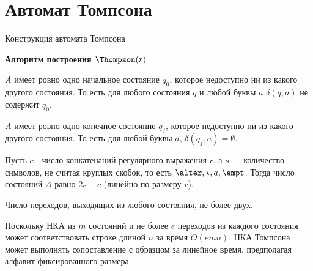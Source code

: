 \section{Автомат Томпсона}
\begin{frame}{Конструкция автомата Томпсона} {\vspace{-5pt}}
    \vspace{-5pt}
    \begin{block}{\bf Алгоритм построения $\Thompson(r)$}
        \begin{wideitemize}
             {
                \item $A$ имеет ровно одно начальное состояние $q_{0}$, которое недоступно ни из какого другого состояния. То есть для любого состояния $q$ и любой буквы $a$ $\delta (q,a)$ не содержит $q_{0}$.
                \item $A$ имеет ровно одно конечное состояние $q_{f}$, которое недоступно ни из какого другого состояния. То есть для любой буквы $a$, $\delta (q_{f},a)=\emptyset$.
                \item Пусть $c$ - число конкатенаций регулярного выражения $r$, а $s$ — количество символов, не считая круглых скобок, то есть $\alter, \star, a, \empt$. Тогда число состояний $A$ равно 2$s - c$ (линейно по размеру $r$).
            }  {
                \item Число переходов, выходящих из любого состояния, не более двух.
                \item Поскольку НКА из $m$ состояний и не более $e$ переходов из каждого состояния может соответствовать строке длиной $n$ за время $O(emn)$, НКА Томпсона может выполнять сопоставление с образцом за линейное время, предполагая алфавит фиксированного размера.
            }
        \end{wideitemize}
    \end{block}
\end{frame} %

